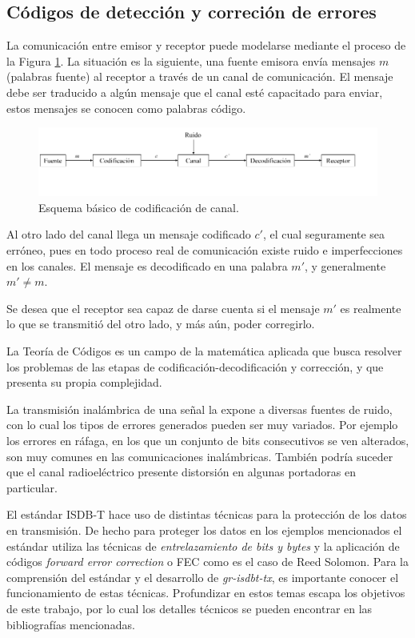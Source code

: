 	\subsection{C\'odigos de detecci\'on y correci\'on de errores}

La comunicación entre emisor y receptor puede modelarse mediante el proceso de la Figura \ref{diagrama_codificacion}. La situación es la siguiente, una fuente emisora envía mensajes $m$ (palabras fuente) al receptor a través de un canal de comunicación. El mensaje debe ser traducido a algún mensaje que el canal esté capacitado para enviar, estos mensajes se conocen como palabras código.

\begin{figure}[h!]
\centering
\includegraphics[scale=0.45]{figuras/cap02/diagrama_codificacion}
\caption{\label{diagrama_codificacion} Esquema básico de codificación de canal.}
\end{figure}

Al otro lado del canal llega un mensaje codificado $c'$, el cual seguramente sea erróneo, pues en todo proceso real de comunicación existe ruido e imperfecciones en los canales. El mensaje es decodificado en una palabra $m'$, y generalmente $m' \neq m$.

Se desea que el receptor sea capaz de darse cuenta si el mensaje $m'$ es realmente lo que se transmitió del otro lado, y más aún, poder corregirlo. 

La Teoría de Códigos es un campo de la matemática aplicada que busca resolver los problemas de las etapas de codificación-decodificación y corrección, y que presenta su propia complejidad.

La transmisión inalámbrica de una señal la expone a diversas fuentes de ruido, con lo cual los tipos de errores generados pueden ser muy variados. Por ejemplo los errores en ráfaga, en los que un conjunto de bits consecutivos se ven alterados, son muy comunes en las comunicaciones inalámbricas. También podría suceder que el canal radioeléctrico presente distorsión en algunas portadoras en particular.

El estándar ISDB-T hace uso de distintas técnicas para la protección de los datos en transmisión. De hecho para proteger los datos en los ejemplos mencionados el estándar utiliza las técnicas de \textit{entrelazamiento de bits y bytes} y la aplicación de códigos \textit{forward error correction} o FEC como es el caso de Reed Solomon. Para la comprensión del estándar y el desarrollo de \textit{gr-isdbt-tx}, es importante conocer el funcionamiento de estas técnicas. Profundizar en estos temas escapa los objetivos de este trabajo, por lo cual los detalles técnicos se pueden encontrar en las bibliografías mencionadas.


